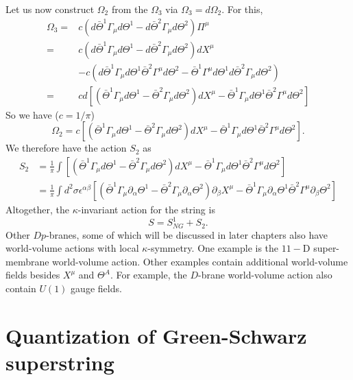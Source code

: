 \documentclass[graybox,envcountchap,sectrefs]{svmono}
\begin{document}
Let us now construct $\Omega_{2}$ from the $\Omega_{3}$ via $\Omega_{3}=d \Omega_{2}$.
For this,
\begin{equation}
\begin{aligned}
\Omega_{3}=& c\left(d \bar{\Theta}^{1} \Gamma_{\mu} d \Theta^{1}-d \bar{\Theta}^{2} \Gamma_{\mu} d \Theta^{2}\right) \Pi^{\mu} \\
=& c\left(d \bar{\Theta}^{1} \Gamma_{\mu} d \Theta^{1}-d \bar{\Theta}^{2} \Gamma_{\mu} d \Theta^{2}\right) d X^{\mu} \\
&-c\left(d \bar{\Theta}^{1} \Gamma_{\mu} d \Theta^{1} \bar{\Theta}^{2} \Gamma^{\mu} d \Theta^{2}-\bar{\Theta}^{1} \Gamma^{\mu} d \Theta^{1} d \bar{\Theta}^{2} \Gamma_{\mu} d \Theta^{2}\right) \\
=& c d\left[\left(\bar{\Theta}^{1} \Gamma_{\mu} d \Theta^{1}-\bar{\Theta}^{2} \Gamma_{\mu} d \Theta^{2}\right) d X^{\mu}-\bar{\Theta}^{1} \Gamma_{\mu} d \Theta^{1} \bar{\Theta}^{2} \Gamma^{\mu} d \Theta^{2}\right]
\end{aligned}
\end{equation}
So we have ($c=1/\pi$)
\begin{equation}
\Omega_{2}=c\left[\left(\bar{\Theta}^{1} \Gamma_{\mu} d \Theta^{1}-\bar{\Theta}^{2} \Gamma_{\mu} d \Theta^{2}\right) d X^{\mu}-\bar{\Theta}^{1} \Gamma_{\mu} d \Theta^{1} \bar{\Theta}^{2} \Gamma^{\mu} d \Theta^{2}\right].
\end{equation}
We therefore have the action $S_{2}$ as
\begin{equation}
\begin{aligned}
S_{2} &=\frac{1}{\pi} \int \left[\left(\bar{\Theta}^{1} \Gamma_{\mu} d \Theta^{1}-\bar{\Theta}^{2} \Gamma_{\mu} d \Theta^{2}\right) d X^{\mu}-\bar{\Theta}^{1} \Gamma_{\mu} d \Theta^{1} \bar{\Theta}^{2} \Gamma^{\mu} d \Theta^{2}\right] \\
&=\frac{1}{\pi} \int d^{2} \sigma \epsilon^{\alpha \beta}\left[\left(\bar{\Theta}^{1} \Gamma_{\mu} \partial_{\alpha} \Theta^{1}-\bar{\Theta}^{2} \Gamma_{\mu} \partial_{\alpha} \Theta^{2}\right) \partial_{\beta} X^{\mu}-\bar{\Theta}^{1} \Gamma_{\mu} \partial_{\alpha} \Theta^{1} \bar{\Theta}^{2} \Gamma^{\mu} \partial_{\beta}\Theta^2\right]
\end{aligned}
\end{equation}
Altogether, the $\kappa$-invariant action for the string is
\begin{equation}
S=S^{1}_{NG}+S_{2}.
\end{equation}
Other $Dp$-branes, some of which will be discussed in later chapters also have world-volume actions with local $\kappa$-symmetry. One example is the $11-\mathrm{D}$ super-membrane world-volume action. Other examples contain additional world-volume fields besides $X^{\mu}$ and  $\Theta^{A}$. For example, the $D$-brane world-volume action also contain $U(1)$ gauge fields.


\section{Quantization of Green-Schwarz superstring}




%

\backmatter%
%
%
\printindex



\end{document}
